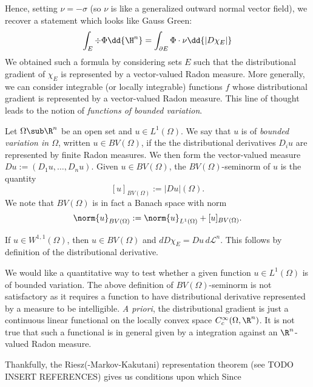 \documentclass[../main.tex]{subfiles}
\begin{document}
Hence, setting $ \nu = -\sigma $ (so $ \nu $ is like a generalized outward normal vector field), we recover a statement which looks like Gauss Green:
\[
    \int_{E} \div{\Phi} \dd{\H^{n}} = \int_{\partial E} \Phi\cdot \nu\dd{|D \chi_{E}|}
\]
We obtained such a formula by considering sets $ E $ such that the distributional gradient of $ \chi_{E} $  is represented by a vector-valued Radon measure. More generally, we can consider integrable (or locally integrable) functions $ f $ whose distributional gradient is represented by a vector-valued Radon measure. This line of thought leads to the notion of \textit{functions of bounded variation}.

\begin{definition}\label{def:BV}
    Let $ \Omega\sub \R^{n} $ be an open set and $ u\in L^{1}(\Omega) $. We say that $ u $ is of \textit{bounded variation in $\Omega$}, written $ u\in BV(\Omega) $, if the the distributional derivatives $ D_{i}u $ are represented by finite Radon measures. We then form the vector-valued measure $ Du:=(D_{1}u,\ldots, D_{n}u) $. Given $ u\in BV(\Omega) $, the $ BV(\Omega) $-seminorm of $ u $ is the quantity 
    \[
        [u]_{BV(\Omega)} := |Du|(\Omega).
    \]
    We note that $ BV(\Omega) $ is in fact a Banach space with norm 
    \[
        \norm{u}_{BV(\Omega)} := \norm{u}_{L^{1}(\Omega)} + [u]_{BV(\Omega)}.
    \]
\end{definition}

\begin{example}
    If $ u\in W^{1,1}(\Omega) $, then $ u\in BV(\Omega) $ and $ dD \chi_{E} = Du \,d \mathcal{L}^{n} $. This follows by definition of the distributional derivative.
\end{example}

We would like a quantitative way to test whether a given function $ u\in L^{1}(\Omega) $ is of bounded variation. The above definition of $ BV(\Omega) $-seminorm is not satisfactory as it requires a function to have distributional derivative represented by a measure to be intelligible. \textit{A priori}, the distributional gradient is just a continuous linear functional on the locally convex space $ C^{\infty}_{c}(\Omega,\R^{n}) $. It is not true that such a functional is in general given by a integration against an $ \R^{n} $-valued Radon measure.

Thankfully, the Riesz(-Markov-Kakutani) representation theorem (see TODO INSERT REFERENCES) gives us conditions upon which 
Since 
\end{document}
